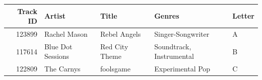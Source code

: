 \begin{tabular}{rllll}
\toprule
Track ID & Artist & Title & Genres & Letter \\
\midrule
123899 & Rachel Mason & Rebel Angels & Singer-Songwriter & A \\
117614 & Blue Dot Sessions & Red City Theme & Soundtrack, Instrumental & B \\
122809 & The Carnys & foolsgame & Experimental Pop & C \\
\bottomrule
\end{tabular}
